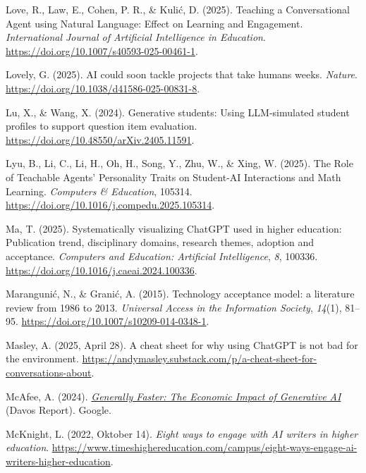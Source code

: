\documentclass[
  ngerman,
  letterpaper,
  DIV=11]{scrreprt}
\newlength{\cslhangindent}
\newenvironment{CSLReferences}[2] %
 {\begin{list}{}{%
  \setlength{\itemindent}{0pt}
  \setlength{\leftmargin}{0pt}
  \setlength{\parsep}{0pt}
  \ifodd #1
   \setlength{\leftmargin}{\cslhangindent}
   \setlength{\itemindent}{-1\cslhangindent}
  \fi
  \setlength{\itemsep}{#2\baselineskip}}}
 {\end{list}}
\begin{document}
\begin{CSLReferences}{1}{0}
Love, R., Law, E., Cohen, P. R., \& Kulić, D. (2025). Teaching a
Conversational Agent using Natural Language: Effect on Learning and
Engagement. \emph{International Journal of Artificial Intelligence in
Education}. \url{https://doi.org/10.1007/s40593-025-00461-1}.

Lovely, G. (2025). AI could soon tackle projects that take humans weeks.
\emph{Nature}. \url{https://doi.org/10.1038/d41586-025-00831-8}.

Lu, X., \& Wang, X. (2024). Generative students: Using LLM-simulated
student profiles to support question item evaluation.
\url{https://doi.org/10.48550/arXiv.2405.11591}.

Lyu, B., Li, C., Li, H., Oh, H., Song, Y., Zhu, W., \& Xing, W. (2025).
The Role of Teachable Agents' Personality Traits on Student-AI
Interactions and Math Learning. \emph{Computers \& Education}, 105314.
\url{https://doi.org/10.1016/j.compedu.2025.105314}.

Ma, T. (2025). Systematically visualizing ChatGPT used in higher
education: Publication trend, disciplinary domains, research themes,
adoption and acceptance. \emph{Computers and Education: Artificial
Intelligence}, \emph{8}, 100336.
\url{https://doi.org/10.1016/j.caeai.2024.100336}.

Marangunić, N., \& Granić, A. (2015). Technology acceptance model: a
literature review from 1986 to 2013. \emph{Universal Access in the
Information Society}, \emph{14}(1), 81--95.
\url{https://doi.org/10.1007/s10209-014-0348-1}.

Masley, A. (2025, April 28). A cheat sheet for why using ChatGPT is not
bad for the environment.
\url{https://andymasley.substack.com/p/a-cheat-sheet-for-conversations-about}.

McAfee, A. (2024).
\emph{\href{https://ide.mit.edu/wp-content/uploads/2024/04/Davos-Report-Draft-XFN-Copy-01112024-Print-Version.pdf?x76181}{Generally
Faster: The Economic Impact of Generative AI}} (Davos Report). Google.

McKnight, L. (2022, Oktober 14). \emph{Eight ways to engage with AI
writers in higher education}.
\url{https://www.timeshighereducation.com/campus/eight-ways-engage-ai-writers-higher-education}.


\end{CSLReferences}
\end{document}
